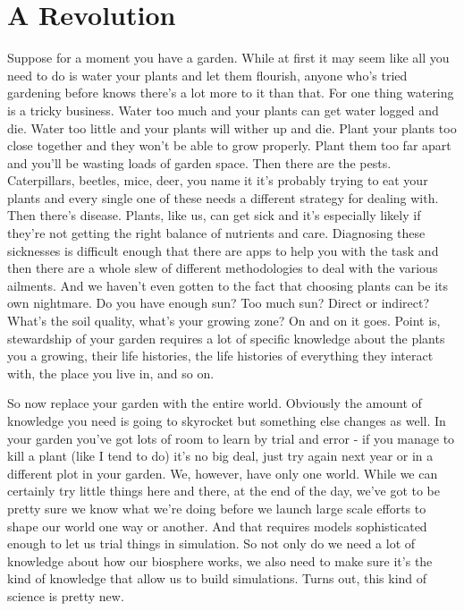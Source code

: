 \documentclass[11pt]{book}
\begin{document}
\section{A Revolution}
Suppose for a moment you have a garden. While at first it may seem like all you need to do is water your plants and let them flourish, anyone who's tried gardening before knows there's a lot more to it than that. For one thing watering is a tricky business. Water too much and your plants can get water logged and die. Water too little and your plants will wither up and die. Plant your plants too close together and they won't be able to grow properly. Plant them too far apart and you'll be wasting loads of garden space. Then there are the pests. Caterpillars, beetles, mice, deer, you name it it's probably trying to eat your plants and every single one of these needs a different strategy for dealing with. Then there's disease. Plants, like us, can get sick and it's especially likely if they're not getting the right balance of nutrients and care. Diagnosing these sicknesses is difficult enough that there are apps to help you with the task and then there are a whole slew of different methodologies to deal with the various ailments. And we haven't even gotten to the fact that choosing plants can be its own nightmare. Do you have enough sun? Too much sun? Direct or indirect? What's the soil quality, what's your growing zone? On and on it goes. Point is, stewardship of your garden requires a lot of specific knowledge about the plants you a growing, their life histories, the life histories of everything they interact with, the place you live in, and so on. 

So now replace your garden with the entire world. Obviously the amount of knowledge you need is going to skyrocket but something else changes as well. In your garden you've got lots of room to learn by trial and error - if you manage to kill a plant (like I tend to do) it's no big deal, just try again next year or in a different plot in your garden. We, however, have only one world. While we can certainly try little things here and there, at the end of the day, we've got to be pretty sure we know what we're doing before we launch large scale efforts to shape our world one way or another. And that requires models sophisticated enough to let us trial things in simulation. So not only do we need a lot of knowledge about how our biosphere works, we also need to make sure it's the kind of knowledge that allow us to build simulations. Turns out, this kind of science is pretty new. 
\newline
\end{document}
